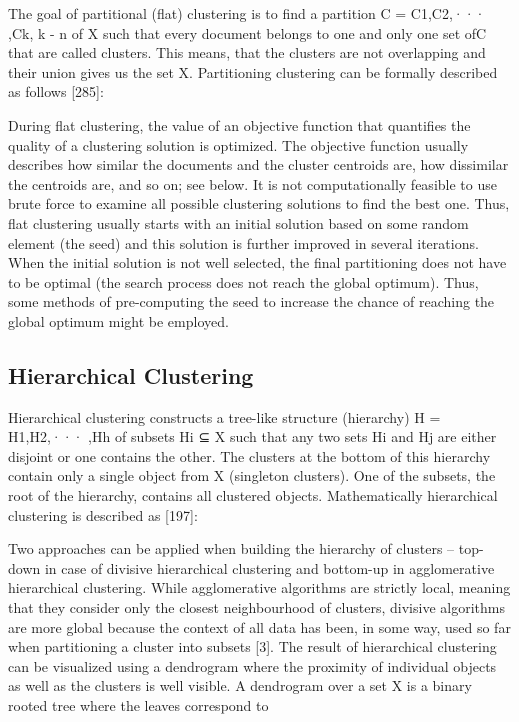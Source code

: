 \documentclass[11pt,openany,executivepaper]{book}
\begin{document}
The goal of partitional (flat) clustering is to find a partition C = {C1,C2,··· ,Ck},
k - n of X such that every document belongs to one and only one set ofC that are
called clusters. This means, that the clusters are not overlapping and their union
gives us the set X. Partitioning clustering can be formally described as follows
[285]:

During flat clustering, the value of an objective function that quantifies the
quality of a clustering solution is optimized. The objective function usually describes how similar the documents and the cluster centroids are, how dissimilar
the centroids are, and so on; see below.
It is not computationally feasible to use brute force to examine all possible
clustering solutions to find the best one. Thus, flat clustering usually starts with
an initial solution based on some random element (the seed) and this solution
is further improved in several iterations. When the initial solution is not well
selected, the final partitioning does not have to be optimal (the search process
does not reach the global optimum). Thus, some methods of pre-computing the
seed to increase the chance of reaching the global optimum might be employed.

\subsection{Hierarchical Clustering}
Hierarchical clustering constructs a tree-like structure (hierarchy) H =
{H1,H2,··· ,Hh} of subsets Hi ⊆ X such that any two sets Hi and Hj are either
disjoint or one contains the other. The clusters at the bottom of this hierarchy
contain only a single object from X (singleton clusters). One of the subsets, the
root of the hierarchy, contains all clustered objects. Mathematically hierarchical
clustering is described as [197]:

Two approaches can be applied when building the hierarchy of clusters –
top-down in case of divisive hierarchical clustering and bottom-up in agglomerative hierarchical clustering. While agglomerative algorithms are strictly local,
meaning that they consider only the closest neighbourhood of clusters, divisive
algorithms are more global because the context of all data has been, in some way,
used so far when partitioning a cluster into subsets [3].
The result of hierarchical clustering can be visualized using a dendrogram
where the proximity of individual objects as well as the clusters is well visible.
A dendrogram over a set X is a binary rooted tree where the leaves correspond to
\end{document}
